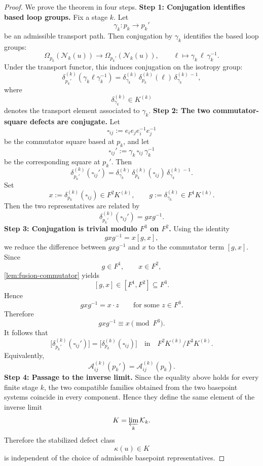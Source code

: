 \begin{proof}
	We prove the theorem in four steps.
	\medskip
	\noindent
	\textbf{Step 1: Conjugation identifies based loop groups.}
	Fix a stage \(k\).
	Let
	\[
		\gamma_k:p_k\to p_k'
	\]
	be an admissible transport path.
	Then conjugation by \(\gamma_k\) identifies the based loop groups:
	\[
		\Omega_{p_k}(\mathcal N_k(u))
		\longrightarrow
		\Omega_{p_k'}(\mathcal N_k(u)),
		\qquad
		\ell\longmapsto \gamma_k\,\ell\,\gamma_k^{-1}.
	\]
	Under the transport functor, this induces conjugation on the isotropy
	group:
	\[
		\delta_{p_k'}^{(k)}(\gamma_k\ell\gamma_k^{-1})
		=
		\delta_{\gamma_k}^{(k)}\,
		\delta_{p_k}^{(k)}(\ell)\,
		\delta_{\gamma_k}^{(k)\,-1},
	\]
	where
	\[
		\delta_{\gamma_k}^{(k)}\in K^{(k)}
	\]
	denotes the transport element associated to \(\gamma_k\).
	\medskip
	\noindent
	\textbf{Step 2: The two commutator-square defects are conjugate.}
	Let
	\[
		\square_{ij}:=e_ie_je_i^{-1}e_j^{-1}
	\]
	be the commutator square based at \(p_k\), and let
	\[
		\square_{ij}':=\gamma_k\,\square_{ij}\,\gamma_k^{-1}
	\]
	be the corresponding square at \(p_k'\).
	Then
	\[
		\delta_{p_k'}^{(k)}(\square_{ij}')
		=
		\delta_{\gamma_k}^{(k)}\,
		\delta_{p_k}^{(k)}(\square_{ij})\,
		\delta_{\gamma_k}^{(k)\,-1}.
	\]
	Set
	\[
		x:=\delta_{p_k}^{(k)}(\square_{ij})\in F^2K^{(k)},
		\qquad
		g:=\delta_{\gamma_k}^{(k)}\in F^1K^{(k)}.
	\]
	Then the two representatives are related by
	\[
		\delta_{p_k'}^{(k)}(\square_{ij}')=gxg^{-1}.
	\]
	\medskip
	\noindent
	\textbf{Step 3: Conjugation is trivial modulo \(F^3\) on \(F^2\).}
	Using the identity
	\[
		gxg^{-1}=x[g,x],
	\]
	we reduce the difference between \(gxg^{-1}\) and \(x\) to the
	commutator term \([g,x]\).
	Since
	\[
		g\in F^1,\qquad x\in F^2,
	\]
	\cref{lem:fusion-commutator} yields
	\[
		[g,x]\in [F^1,F^2]\subseteq F^3.
	\]
	Hence
	\[
		gxg^{-1}=x\cdot z
		\qquad
		\text{for some }z\in F^3.
	\]
	Therefore
	\[
		gxg^{-1}\equiv x\pmod{F^3}.
	\]
	It follows that
	\[
		\bigl[\delta_{p_k'}^{(k)}(\square_{ij}')\bigr]
		=
		\bigl[\delta_{p_k}^{(k)}(\square_{ij})\bigr]
		\quad\text{in}\quad
		F^2K^{(k)}/F^3K^{(k)}.
	\]
	Equivalently,
	\[
		\mathcal A_{ij}^{(k)}(p_k')
		=
		\mathcal A_{ij}^{(k)}(p_k).
	\]
	\medskip
	\noindent
	\textbf{Step 4: Passage to the inverse limit.}
	Since the equality above holds for every finite stage \(k\), the two
	compatible families obtained from the two basepoint systems coincide in
	every component. Hence they define the same element of the inverse limit
	\[
		K=\varprojlim_k \mathcal K_k.
	\]
	Therefore the stabilized defect class
	\[
		\kappa(u)\in K
	\]
	is independent of the choice of admissible basepoint representatives.
\end{proof}
